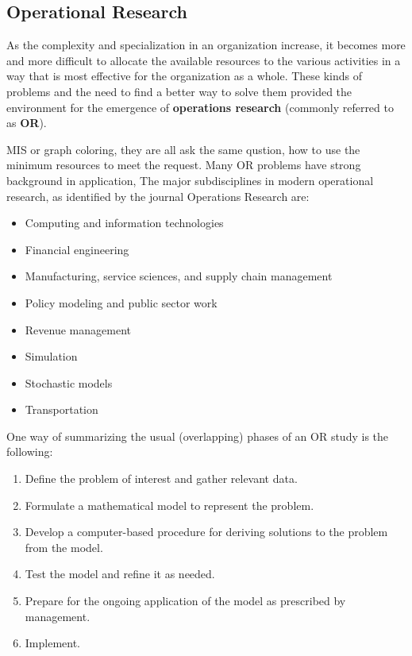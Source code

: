 \documentclass[10pt, a4paper, twocolumn]{article} %
\begin{document}

\subsection{Operational Research}
As the complexity and specialization in an organization
increase, it becomes more and more difficult to allocate the available resources
to the various activities in a way that is most effective for the organization as a whole.
These kinds of problems and the need to find a better way to solve them provided
the environment for the emergence of \textbf{operations research} (commonly
referred to as \textbf{OR}).

MIS or graph coloring, they are all ask the same qustion, how to use the minimum
resources to meet the request. Many OR problems have strong background in
application, The major subdisciplines in modern operational research, as
identified by the journal Operations Research are:
\begin{itemize}
    \item Computing and information technologies
    \item Financial engineering
    \item Manufacturing, service sciences, and supply chain management
    \item Policy modeling and public sector work
    \item Revenue management
    \item Simulation
    \item Stochastic models
    \item Transportation
\end{itemize}

One way of summarizing the usual (overlapping) phases of an OR study is the following:
\begin{enumerate}
    \item Define the problem of interest and gather relevant data.
    \item Formulate a mathematical model to represent the problem.
    \item Develop a computer-based procedure for deriving solutions to the problem from the model.
    \item Test the model and refine it as needed.
    \item Prepare for the ongoing application of the model as prescribed by management.
    \item Implement.
\end{enumerate}
\end{document}
